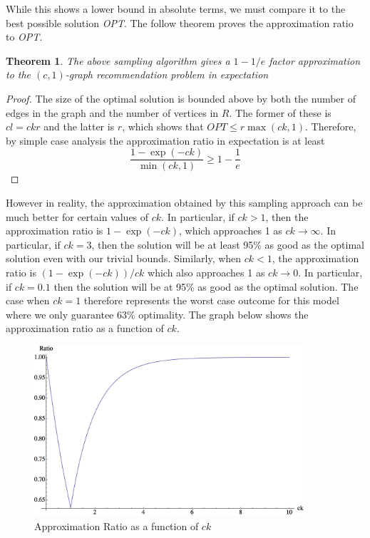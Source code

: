 \documentclass[11pt]{article}
\newtheorem{thm}{Theorem}
\begin{document}
While this shows a lower bound in absolute terms, we must compare it to the best possible solution {\em OPT}. The follow theorem proves the approximation ratio to {\em OPT}.

\begin{thm}
The above sampling algorithm gives a $1-1/e$ factor approximation to the $(c,1)$-graph recommendation problem in expectation
\end{thm}
\begin{proof}
The size of the optimal solution is bounded above by both the number
of edges in the graph and the number of vertices in $R$. The former of
these is $cl=ckr$ and the latter is $r$, which shows that $OPT \leq
r\max(ck,1)$. Therefore, by simple case analysis the approximation ratio in
expectation is at least
\[ \frac{1-\exp(-ck)}{\min(ck,1)} \geq 1-\frac{1}{e} \]
\end{proof}

However in reality, the approximation obtained by this sampling
approach can be much better for certain values of $ck$. In particular,
if $ck>1$, then the approximation ratio is $1-\exp(-ck)$, which
approaches 1 as $ck\to\infty$. In particular, if $ck=3$, then the
solution will be at least 95\% as good as the optimal solution even
with our trivial bounds. Similarly, when $ck<1$, the approximation
ratio is $(1-\exp(-ck))/ck$ which also approaches 1 as $ck\to 0$. In
particular, if $ck=0.1$ then the solution will be at 95\% as good as
the optimal solution. The case when $ck=1$ therefore represents the
worst case outcome for this model where we only guarantee 63\%
optimality. The graph below shows the approximation ratio as a
function of $ck$.

\begin{figure}[h]
\centering
\includegraphics[width=10cm]{Sri_Original.png}
\caption{Approximation Ratio as a function of $ck$ }
\end{figure}
\end{document}
